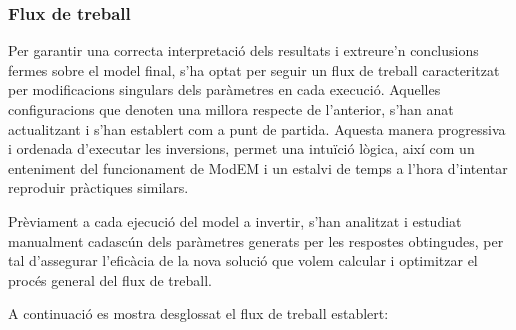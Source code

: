 \documentclass[11pt,a4paper,oneside]{article}
\begin{document}
\subsubsection{Flux de treball}


Per garantir una correcta interpretació dels resultats i extreure'n conclusions fermes sobre el model final, s'ha optat per seguir un flux de treball caracteritzat per modificacions singulars dels paràmetres en cada execució. Aquelles configuracions que denoten una millora respecte de l'anterior, s'han anat actualitzant i s'han establert com a punt de partida. Aquesta manera progressiva i ordenada d'executar les inversions, permet una intuïció lògica, així com un enteniment del funcionament de ModEM i un estalvi de temps a l'hora d'intentar reproduir pràctiques similars.


\vspace{5pt}

Prèviament a cada ejecució del model a invertir, s'han analitzat i estudiat manualment cadascún dels paràmetres generats per les respostes obtingudes, per tal d'assegurar l'eficàcia de la nova solució que volem calcular i optimitzar el procés general del flux de treball.

\vspace{5pt}

A continuació es mostra desglossat el flux de treball establert:
\end{document}
